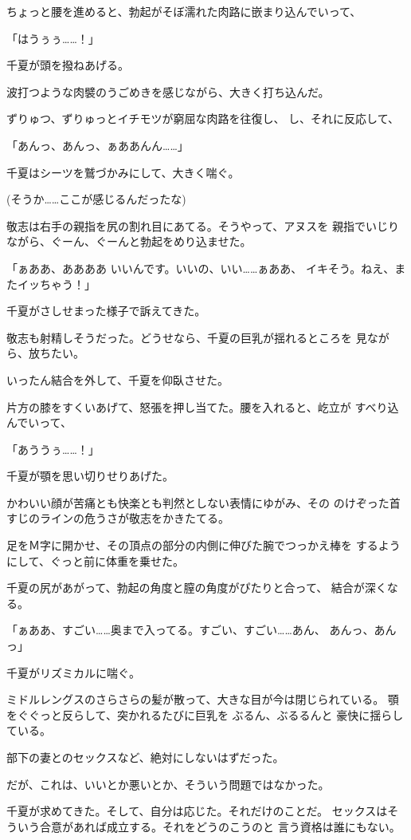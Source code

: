 ﻿\documentclass[
    book,tate,
    line_length=30zw,
    jafontsize=12pt,
    paper=b5j,
    landscape,
    ]{jlreq}
\begin{document}
ちょっと腰を進めると、勃起がそぼ濡れた肉路に嵌まり込んでいって、

「はうぅぅ……！」

千夏が頭を撥ねあげる。

波打つような肉襞のうごめきを感じながら、大きく打ち込んだ。

ずりゅつ、ずりゅっとイチモツが窮屈な肉路を往復し、
し、それに反応して、

「あんっ、あんっ、ぁああんん……」

千夏はシーツを鷲づかみにして、大きく喘ぐ。

(そうか……ここが感じるんだったな)

敬志は右手の親指を尻の割れ目にあてる。そうやって、アヌスを
親指でいじりながら、ぐーん、ぐーんと勃起をめり込ませた。

「ぁああ、ああああ いいんです。いいの、いい……ぁああ、
イキそう。ねえ、またイッちゃう！」

千夏がさしせまった様子で訴えてきた。

敬志も射精しそうだった。どうせなら、千夏の巨乳が揺れるところを
見ながら、放ちたい。

いったん結合を外して、千夏を仰臥させた。

片方の膝をすくいあげて、怒張を押し当てた。腰を入れると、屹立が
すべり込んでいって、

「あううぅ……！」

千夏が顎を思い切りせりあげた。

かわいい顔が苦痛とも快楽とも判然としない表情にゆがみ、その
のけぞった首すじのラインの危うさが敬志をかきたてる。

足をＭ字に開かせ、その頂点の部分の内側に伸びた腕でつっかえ棒を
するようにして、ぐっと前に体重を乗せた。

千夏の尻があがって、勃起の角度と膣の角度がぴたりと合って、
結合が深くなる。

「ぁああ、すごい……奥まで入ってる。すごい、すごい……あん、
あんっ、あんっ」

千夏がリズミカルに喘ぐ。

ミドルレングスのさらさらの髪が散って、大きな目が今は閉じられている。
顎をぐぐっと反らして、突かれるたびに巨乳を ぶるん、ぶるるんと
豪快に揺らしている。

部下の妻とのセックスなど、絶対にしないはずだった。

だが、これは、いいとか悪いとか、そういう問題ではなかった。

千夏が求めてきた。そして、自分は応じた。それだけのことだ。
セックスはそういう合意があれば成立する。それをどうのこうのと
言う資格は誰にもない。
\end{document}
